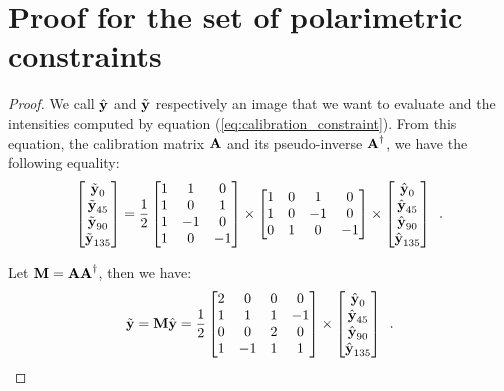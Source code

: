 \chapter{Proof for the set of polarimetric constraints}
\label{app:physical_prop}

\begin{proof}
	We call $\hat{\textbf{y}}$ and $\tilde{\textbf{y}}$ respectively an image that we want to evaluate and the intensities computed by equation (\ref{eq:calibration_constraint}). From this equation, the calibration matrix $\ma$ and its pseudo-inverse $\ma^\dagger$, we have the following equality:
	\begin{equation}
			\label{eq:app_problem}
		\begin{bmatrix} 
			\tilde{\textbf{y}}_0 \\
			\tilde{\textbf{y}}_{45} \\	
			\tilde{\textbf{y}}_{90} \\
			\tilde{\textbf{y}}_{135} 
		\end{bmatrix} = \frac{1}{2}\begin{bmatrix}
			1 & 1 & 0 \\
			1 & 0 & 1 \\
			1 & -1 & 0 \\
			1 & 0 & -1
		\end{bmatrix}
		\times \begin{bmatrix}
			1 & 0 & 1 & 0 \\
			1 & 0 & -1 & 0 \\
			0 & 1 & 0 & -1
		\end{bmatrix} \times \begin{bmatrix} 
			\hat{\textbf{y}}_0 \\
			\hat{\textbf{y}}_{45} \\
			\hat{\textbf{y}}_{90} \\
			\hat{\textbf{y}}_{135}
		\end{bmatrix}\enspace.
	\end{equation}
	
	Let $\mm = \ma\ma^\dagger$, then we have:
	$$
	\tilde{\vy} = \mm\hat{\vy} = \frac{1}{2}\begin{bmatrix}
		2 & 0 & 0 & 0 \\
		1 & 1 & 1 & -1 \\
		0 & 0 & 2 & 0 \\
		1 & -1 & 1 & 1
	\end{bmatrix} \times \begin{bmatrix} 
		\hat{\vy}_0 \\
		\hat{\vy}_{45} \\
		\hat{\vy}_{90} \\
		\hat{\vy}_{135}
	\end{bmatrix} \enspace.
	$$
	

\end{proof}
